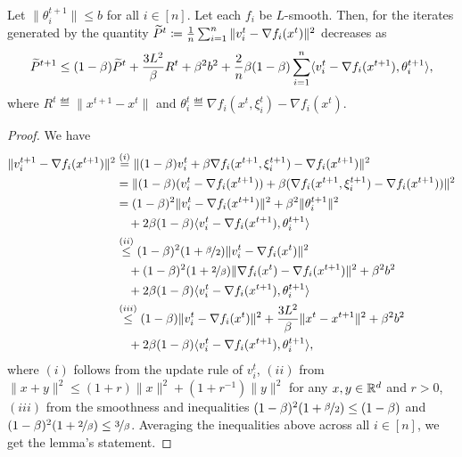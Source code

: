 \documentclass[a4paper,11pt]{article}
\begin{document}
\begin{lemma}\label{lem:descent_Pt_tilde_dp}
    Let $\|\theta^{t+1}_i\|\le b$ for all $i\in[n]$. Let each $f_i$ be $L$-smooth. Then, for the iterates generated by  the quantity $\widetilde{P}^t \coloneqq \frac{1}{n}\sum_{i=1}^n\|v_i^t - \nabla f_i(x^t)\|^2$ decreases as 
    \begin{equation}
    \wtilde{P}^{t+1} \le (1-\beta)\wtilde{P}^t + \frac{3L^2}{\beta}R^t + \beta^2b^2 + \frac{2}{n}\beta(1-\beta)\sum_{i=1}^n\<v_i^t - \nabla f_i(x^{t+1}), \theta^{t+1}_i>,
    \end{equation}
    where $R^t \eqdef \|x^{t+1} - x^t\|$ and $\theta^t_i \eqdef \nabla f_i(x^t,\xi^t_i) - \nabla f_i(x^t)$.
\end{lemma}
\begin{proof}
    We have 
    \begin{align*}
        \|v_i^{t+1} - \nabla f_i(x^{t+1})\|^2 
        &\overset{(i)}{=} \|(1-\beta)v_i^t + \beta\nabla f_i(x^{t+1},\xi^{t+1}_i) - \nabla f_i(x^{t+1})\|^2\\
        &= \|(1-\beta)(v_i^t - \nabla f_i(x^{t+1})) + \beta(\nabla f_i(x^{t+1},\xi^{t+1}_i)- \nabla f_i(x^{t+1}))\|^2\\
        &= (1-\beta)^2\|v_i^t - \nabla f_i(x^{t+1})\|^2
        + \beta^2\|\theta^{t+1}_i\|^2\\
        &\quad + 2\beta(1-\beta)\<v_i^t - \nabla f_i(x^{t+1}), \theta^{t+1}_i>\\
        &\overset{(ii)}{\le} (1-\beta)^2(1+\nicefrac{\beta}{2})\|v_i^t - \nabla f_i(x^t)\|^2\\
        & \quad + (1-\beta)^2(1+\nicefrac{2}{\beta})\|\nabla f_i(x^t) - \nabla f_i(x^{t+1})\|^2
        + \beta^2b^2\\
        &\quad + 2\beta(1-\beta)\<v_i^t - \nabla f_i(x^{t+1}), \theta^{t+1}_i>\\
        &\overset{(iii)}{\le} (1-\beta)\|v_i^t - \nabla f_i(x^t)\|^2
        + \frac{3L^2}{\beta}\|x^t - x^{t+1}\|^2
        + \beta^2 b^2\\
        &\quad + 2\beta(1-\beta)\<v_i^t - \nabla f_i(x^{t+1}), \theta^{t+1}_i>,
    \end{align*}
    where $(i)$ follows from the update rule of $v_i^t$, $(ii)$ from $\|x+y\|^2 \le (1+r)\|x\|^2 + (1+r^{-1})\|y\|^2$ for any $x,y\in\mathbb{R}^d$ and $r > 0$, $(iii)$ from the smoothness and inequalities $(1-\beta)^2(1+\nicefrac{\beta}{2}) \le (1-\beta)$ and $(1-\beta)^2(1+\nicefrac{2}{\beta}) \le \nicefrac{3}{\beta}$. Averaging the inequalities above across all  $i\in[n]$, we get the lemma's statement.
\end{proof}
\end{document}
